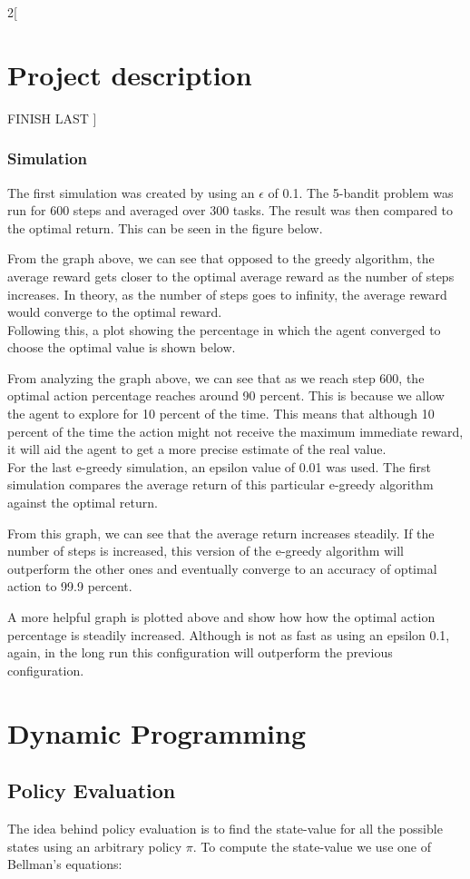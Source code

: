 \documentclass[a4paper]{article}
\begin{document}
\begin{multicols}{2}[
		\section*{Project description}
		FINISH LAST
		]
		\subsubsection{Simulation}
		The first simulation was created by using an $\epsilon$ of 0.1. The 5-bandit problem was run for 600 steps and averaged over 300 tasks. The result was then compared to the optimal return. This can be seen in the figure below.

		
		From the graph above, we can see that opposed to the greedy algorithm, the average reward gets closer to the optimal average reward as the number of steps increases. In theory, as the number of steps goes to infinity, the average reward would converge to the optimal reward. \\
		
		Following this, a plot showing the percentage in which the agent converged to choose the optimal value is shown below.
		

		
		From analyzing the graph above, we can see that as we reach step 600, the optimal action percentage reaches around 90 percent. This is because we allow the agent to explore for 10 percent of the time. This means that although 10 percent of the time the action might not receive the maximum immediate reward, it will aid the agent to get a more precise estimate of the real value. \\
		
		For the last e-greedy simulation, an epsilon value of 0.01 was used. The first simulation compares the average return of this particular e-greedy algorithm against the optimal return.
		
		
		From this graph, we can see that the average return increases steadily. If the number of steps is increased, this version of the e-greedy algorithm will outperform the other ones and eventually converge to an accuracy of optimal action to 99.9 percent.
		
	
		A more helpful graph is plotted above and show how how the optimal action percentage is steadily increased. Although is not as fast as using an epsilon 0.1, again, in the long run this configuration will outperform the previous configuration.
		
		\section{Dynamic Programming}
		\subsection{Policy Evaluation}
		The idea behind policy evaluation is to find the state-value for all the possible states using an arbitrary policy $\pi$. To compute the state-value we use one of Bellman's equations:
		

\end{multicols}
\end{document}
